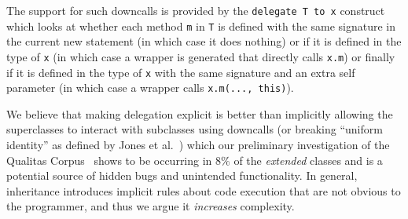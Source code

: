 \documentclass[preprint,10pt]{sigplanconf}
\begin{document}
The support for such downcalls is provided by the \texttt{delegate T to x} construct which looks at whether each method \texttt{m} in \texttt{T} is defined with the same signature in the current new statement (in which case it does nothing) or if it is defined in the type of \texttt{x} (in which case a wrapper is generated that directly calls \texttt{x.m}) or finally if it is defined in the type of \texttt{x} with the same signature and an extra self parameter (in which case a wrapper calls \texttt{x.m(..., this)}).

We believe that making delegation explicit is better than implicitly
allowing the superclasses to interact with subclasses using downcalls (or breaking ``uniform identity'' as defined by Jones et al.~\cite{jones:2016:inheritance}) which our preliminary investigation of the Qualitas Corpus~\cite{QualitasCorpus:APSEC:2010} shows to be occurring in $8\%$ of the \textit{extended} classes and is a potential source of hidden bugs and unintended functionality. In general, inheritance introduces implicit rules about code execution that are not obvious to the programmer, and thus we argue it \textit{increases} complexity.





\end{document}
